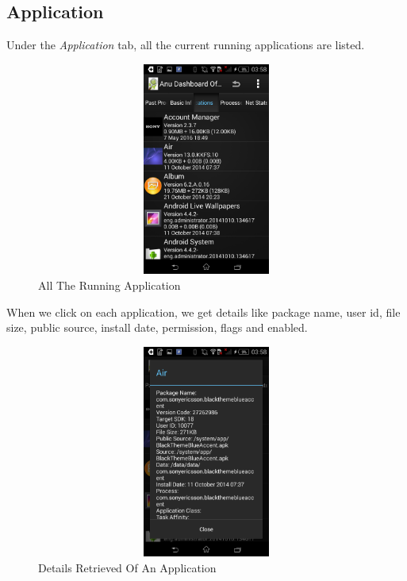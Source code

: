 \documentclass[12pt]{report}
\begin{document}
\subsection{Application}
Under the \textit{Application} tab, all the current running applications are listed.
\begin{figure}[H]
	\centering
	\includegraphics[width=1.0\textwidth,width=5cm,height=7cm]{application_list}
	\caption{All The Running Application}
\end{figure}
When we click on each application, we get details like package name, user id, file size, public source, install date, permission, flags and enabled.
\begin{figure}[H]
	\centering
	\includegraphics[width=1.0\textwidth,width=5cm,height=7cm]{application_details}
	\caption{Details Retrieved Of An Application}
\end{figure}
\end{document}
